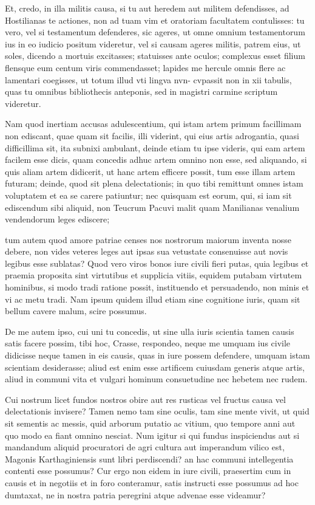  Et, credo, in illa militis causa, si tu aut heredem aut militem defendisses, ad Hostilianas te actiones, non ad tuam vim et oratoriam facultatem contulisses: tu vero, vel si testamentum defenderes, sic ageres, ut omne omnium testamentorum ius in eo iudicio positum videretur, vel si causam ageres militis, patrem eius, ut soles, dicendo a mortuis excitasses; statuisses ante oculos; complexus esset filium flensque eum centum viris commendasset; lapides me hercule omnis flere ac lamentari coegisses, ut totum illud vti lingva nvn- cvpassit non in xii tabulis, quas tu omnibus bibliothecis anteponis, sed in magistri carmine scriptum videretur.

 Nam quod inertiam accusas adulescentium, qui istam artem primum facillimam non ediscant, quae quam sit facilis, illi viderint, qui eius artis adrogantia, quasi difficillima sit, ita subnixi ambulant, deinde etiam tu ipse videris, qui eam artem facilem esse dicis, quam concedis adhuc artem omnino non esse, sed aliquando, si quis aliam artem didicerit, ut hanc artem efficere possit, tum esse illam artem futuram; deinde, quod sit plena delectationis; in quo tibi remittunt omnes istam voluptatem et ea se carere patiuntur; nec quisquam est eorum, qui, si iam sit ediscendum sibi aliquid, non Teucrum Pacuvi malit quam Manilianas venalium vendendorum leges ediscere;

 tum autem quod amore patriae censes nos nostrorum maiorum inventa nosse debere, non vides veteres leges aut ipsas sua vetustate consenuisse aut novis legibus esse sublatas? Quod vero viros bonos iure civili fieri putas, quia legibus et praemia proposita sint virtutibus et supplicia vitiis, equidem putabam virtutem hominibus, si modo tradi ratione possit, instituendo et persuadendo, non minis et vi ac metu tradi. Nam ipsum quidem illud etiam sine cognitione iuris, quam sit bellum cavere malum, scire possumus.

 De me autem ipso, cui uni tu concedis, ut sine ulla iuris scientia tamen causis satis facere possim, tibi hoc, Crasse, respondeo, neque me umquam ius civile didicisse neque tamen in eis causis, quas in iure possem defendere, umquam istam scientiam desiderasse; aliud est enim esse artificem cuiusdam generis atque artis, aliud in communi vita et vulgari hominum consuetudine nec hebetem nec rudem.

 Cui nostrum licet fundos nostros obire aut res rusticas vel fructus causa vel delectationis invisere? Tamen nemo tam sine oculis, tam sine mente vivit, ut quid sit sementis ac messis, quid arborum putatio ac vitium, quo tempore anni aut quo modo ea fiant omnino nesciat. Num igitur si qui fundus inspiciendus aut si mandandum aliquid procuratori de agri cultura aut imperandum vilico est, Magonis Karthaginiensis sunt libri perdiscendi? an hac communi intellegentia contenti esse possumus? Cur ergo non eidem in iure civili, praesertim cum in causis et in negotiis et in foro conteramur, satis instructi esse possumus ad hoc dumtaxat, ne in nostra patria peregrini atque advenae esse videamur?

